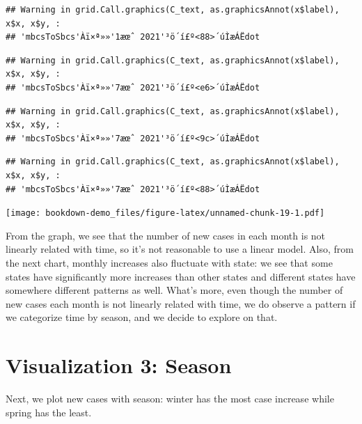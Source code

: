 \documentclass[
]{book}
\begin{document}
\begin{verbatim}
## Warning in grid.Call.graphics(C_text, as.graphicsAnnot(x$label), x$x, x$y, :
## 'mbcsToSbcs'Àï×ª»»'1æœˆ 2021'³ö´í£º<88>´úÌæÁËdot
\end{verbatim}

\begin{verbatim}
## Warning in grid.Call.graphics(C_text, as.graphicsAnnot(x$label), x$x, x$y, :
## 'mbcsToSbcs'Àï×ª»»'7æœˆ 2021'³ö´í£º<e6>´úÌæÁËdot
\end{verbatim}

\begin{verbatim}
## Warning in grid.Call.graphics(C_text, as.graphicsAnnot(x$label), x$x, x$y, :
## 'mbcsToSbcs'Àï×ª»»'7æœˆ 2021'³ö´í£º<9c>´úÌæÁËdot
\end{verbatim}

\begin{verbatim}
## Warning in grid.Call.graphics(C_text, as.graphicsAnnot(x$label), x$x, x$y, :
## 'mbcsToSbcs'Àï×ª»»'7æœˆ 2021'³ö´í£º<88>´úÌæÁËdot
\end{verbatim}

\texttt{[image: bookdown-demo\_files/figure-latex/unnamed-chunk-19-1.pdf]}

From the graph, we see that the number of new cases in each month is not linearly related with time, so it's not reasonable to use a linear model. Also, from the next chart, monthly increases also fluctuate with state: we see that some states have significantly more increases than other states and different states have somewhere different patterns as well. What's more, even though the number of new cases each month is not linearly related with time, we do observe a pattern if we categorize time by season, and we decide to explore on that.

\hypertarget{visualization-3-season}{%
\section{Visualization 3: Season}\label{visualization-3-season}}

Next, we plot new cases with season: winter has the most case increase while spring has the least.
\end{document}
